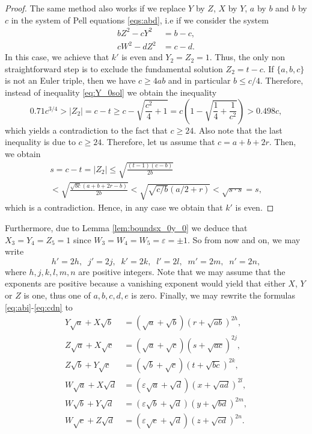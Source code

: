 \documentclass{amsart}
\theoremstyle{definition}
\begin{document}
\begin{proof}
The same method also works if we replace $Y$ by $Z$, $X$ by $Y$, $a$ by $b$ and $b$ by $c$ in the system of Pell equations \eqref{eqs:abd}, i.e if we consider the system
\begin{equation*}
\begin{split}
bZ^2 - cY^2 &= b - c, \\
cW^2 - dZ^2 &= c - d.
\end{split}
\end{equation*}
In this case, we achieve that $k'$ is even and $Y_2=Z_2=1$. Thus, the only non straightforward step is to exclude the fundamental solution $Z_2=t-c$. If $\{a,b,c\}$ is not an Euler triple, then we have $c\geq 4ab$ and in particular $b\leq c/4$. Therefore,  instead of inequality \eqref{eq:Y_0sol} we obtain the inequality
$$0.71c^{3/4}>|Z_2|=c-t\geq c-\sqrt{\frac{c^2}4+1}=c\left(1-\sqrt{\frac14+\frac{1}{c^2}}\right)>0.498 c,$$
which yields a contradiction to the fact that $c\geq 24$. Also note that the last inequality is due to $c\geq 24$. Therefore, let us assume that $c=a+b+2r$. Then, we obtain
\begin{multline*}
s=c-t=|Z_2|\leq \sqrt{\frac{(t-1)(c-b)}{2b}} \\
<\sqrt{\frac{\sqrt{bc}(a+b+2r-b)}{2b}}<\sqrt{\sqrt{c/b}(a/2+r)}<\sqrt{s\cdot s}=s,
\end{multline*}
which is a contradiction. Hence, in any case we obtain that $k'$ is even.
\end{proof}

Furthermore, due to Lemma \ref{lem:boundsx_0y_0} we deduce that $X_3=Y_4=Z_5=1$ since $W_3=W_4=W_5=\varepsilon=\pm 1$.  So from now and on, we may write
$$
h'=2h,\;\; j'=2j,\;\; k'=2k,\;\; l'=2l,\;\; m'=2m, \;\; n'=2n,
$$
where $h,j,k,l,m,n$ are positive integers. Note that we may assume that the exponents are positive because a vanishing exponent would yield that either $X$, $Y$ or $Z$ is one, thus one of $a,b,c,d,e$ is zero.
Finally, we may rewrite the formulas \eqref{eq:abi}-\eqref{eq:cdn} to
\begin{align}\label{eq:abii}
Y \sqrt{a} + X \sqrt{b} &= (\sqrt{a} + \sqrt{b})(r+\sqrt{ab})^{2h},\\\label{eq:acjj}
Z \sqrt{a} + X \sqrt{c} &= (\sqrt{a} + \sqrt{c})(s+\sqrt{ac})^{2j},\\\label{eq:bckk}
Z \sqrt{b} + Y \sqrt{c} &= (\sqrt{b} + \sqrt{c})(t+\sqrt{bc})^{2k},\\\label{eq:adll}
W \sqrt{a} + X \sqrt{d} &= (\varepsilon \sqrt{a} + \sqrt{d})(x+\sqrt{ad})^{2l},\\\label{eq:bdmm}
W \sqrt{b} + Y \sqrt{d} &= (\varepsilon \sqrt{b} + \sqrt{d})(y+\sqrt{bd})^{2m},\\\label{eq:cdnn}
W \sqrt{c} + Z \sqrt{d} &= (\varepsilon \sqrt{c} + \sqrt{d})(z+\sqrt{cd})^{2n}.
\end{align}
\end{document}
